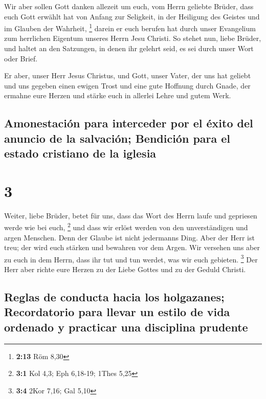  Wir aber sollen Gott danken allezeit um euch, vom Herrn
geliebte Brüder, dass euch Gott erwählt hat von Anfang zur Seligkeit, in
der Heiligung des Geistes und im Glauben der Wahrheit, \footnote{\textbf{2:13}
  Röm 8,30}  darein er euch berufen hat durch unser
Evangelium zum herrlichen Eigentum unseres Herrn Jesu Christi.
 So stehet nun, liebe Brüder, und haltet an den
Satzungen, in denen ihr gelehrt seid, es sei durch unser Wort oder
Brief.

 Er aber, unser Herr Jesus Christus, und Gott, unser
Vater, der uns hat geliebt und uns gegeben einen ewigen Trost und eine
gute Hoffnung durch Gnade,  der ermahne eure Herzen und
stärke euch in allerlei Lehre und gutem Werk.

\hypertarget{amonestaciuxf3n-para-interceder-por-el-uxe9xito-del-anuncio-de-la-salvaciuxf3n-bendiciuxf3n-para-el-estado-cristiano-de-la-iglesia}{%
\subsection{Amonestación para interceder por el éxito del anuncio de la
salvación; Bendición para el estado cristiano de la
iglesia}\label{amonestaciuxf3n-para-interceder-por-el-uxe9xito-del-anuncio-de-la-salvaciuxf3n-bendiciuxf3n-para-el-estado-cristiano-de-la-iglesia}}

\hypertarget{section-2}{%
\section{3}\label{section-2}}

 Weiter, liebe Brüder, betet für uns, dass das Wort des
Herrn laufe und gepriesen werde wie bei euch, \footnote{\textbf{3:1} Kol
  4,3; Eph 6,18-19; 1Thes 5,25}  und dass wir erlöst
werden von den unverständigen und argen Menschen. Denn der Glaube ist
nicht jedermanns Ding.  Aber der Herr ist treu; der wird
euch stärken und bewahren vor dem Argen.  Wir versehen uns
aber zu euch in dem Herrn, dass ihr tut und tun werdet, was wir euch
gebieten. \footnote{\textbf{3:4} 2Kor 7,16; Gal 5,10}  Der
Herr aber richte eure Herzen zu der Liebe Gottes und zu der Geduld
Christi.

\hypertarget{reglas-de-conducta-hacia-los-holgazanes-recordatorio-para-llevar-un-estilo-de-vida-ordenado-y-practicar-una-disciplina-prudente}{%
\subsection{Reglas de conducta hacia los holgazanes; Recordatorio para
llevar un estilo de vida ordenado y practicar una disciplina
prudente}\label{reglas-de-conducta-hacia-los-holgazanes-recordatorio-para-llevar-un-estilo-de-vida-ordenado-y-practicar-una-disciplina-prudente}}

